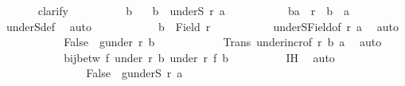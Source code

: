 \begin{isabellebody}
\ \ \ \ \ \ \isamarkupfalse%
{\isacharparenleft}{\kern0pt}clarify{\isacharparenright}{\kern0pt}\isanewline
\ \ \ \ \ \ \ \ \isamarkupfalse%
\ b\ \isamarkupfalse%
\ {\isacharasterisk}{\kern0pt}{\isacharasterisk}{\kern0pt}{\isacharasterisk}{\kern0pt}{\isacharcolon}{\kern0pt}\ {\isachardoublequoteopen}b\ {\isasymin}\ underS\ r\ a{\isachardoublequoteclose}\isanewline
\ \ \ \ \ \ \ \ \isamarkupfalse%
\ {}{\isacharcolon}{\kern0pt}\ {\isachardoublequoteopen}{\isacharparenleft}{\kern0pt}b{\isacharcomma}{\kern0pt}a{\isacharparenright}{\kern0pt}\ {\isasymin}\ r\ {\isasymand}\ b\ {\isasymnoteq}\ a{\isachardoublequoteclose}\ \isamarkupfalse%
\ underS{\isacharunderscore}{\kern0pt}def\ \isamarkupfalse%
\ auto\isanewline
\ \ \ \ \ \ \ \ \isamarkupfalse%
\ \isamarkupfalse%
\ {\isachardoublequoteopen}b\ {\isasymin}\ Field\ r{\isachardoublequoteclose}\isanewline
\ \ \ \ \ \ \ \ \isamarkupfalse%
\ {\isacharasterisk}{\kern0pt}{\isacharasterisk}{\kern0pt}{\isacharasterisk}{\kern0pt}\ underS{\isacharunderscore}{\kern0pt}Field{\isacharbrackleft}{\kern0pt}of\ r\ a{\isacharbrackright}{\kern0pt}\ \isamarkupfalse%
\ auto\isanewline
\ \ \ \ \ \ \ \ \isamarkupfalse%
\ \isamarkupfalse%
\ {\isachardoublequoteopen}False\ {\isasymnotin}\ g{\isacharbackquote}{\kern0pt}{\isacharparenleft}{\kern0pt}under\ r\ b{\isacharparenright}{\kern0pt}{\isachardoublequoteclose}\isanewline
\ \ \ \ \ \ \ \ \isamarkupfalse%
\ {}\ {\isacharasterisk}{\kern0pt}{\isacharasterisk}{\kern0pt}\ Trans\ under{\isacharunderscore}{\kern0pt}incr{\isacharbrackleft}{\kern0pt}of\ r\ b\ a{\isacharbrackright}{\kern0pt}\ \isamarkupfalse%
\ auto\isanewline
\ \ \ \ \ \ \ \ \isamarkupfalse%
\ \isamarkupfalse%
\ {\isachardoublequoteopen}bij{\isacharunderscore}{\kern0pt}betw\ f\ {\isacharparenleft}{\kern0pt}under\ r\ b{\isacharparenright}{\kern0pt}\ {\isacharparenleft}{\kern0pt}under\ r{\isacharprime}{\kern0pt}\ {\isacharparenleft}{\kern0pt}f\ b{\isacharparenright}{\kern0pt}{\isacharparenright}{\kern0pt}{\isachardoublequoteclose}\isanewline
\ \ \ \ \ \ \ \ \isamarkupfalse%
\ IH\ \isamarkupfalse%
\ auto\isanewline
\ \ \ \ \ \ \isamarkupfalse%
\isanewline
\ \ \ \ \ \ \isanewline
\ \ \ \ \ \ \isamarkupfalse%
\ {}{}{\isacharcolon}{\kern0pt}\ {\isachardoublequoteopen}False\ {\isasymnotin}\ g{\isacharbackquote}{\kern0pt}{\isacharparenleft}{\kern0pt}underS\ r\ a{\isacharparenright}{\kern0pt}{\isachardoublequoteclose}\isanewline

\end{isabellebody}
